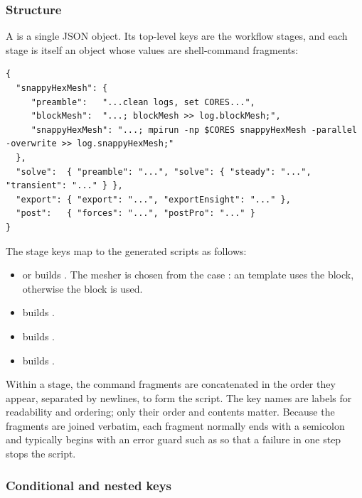 \subsubsection{Structure}

A  is a single JSON object. Its top-level keys are the workflow stages, and each stage is itself an object whose values are shell-command fragments:
\begin{lstlisting}
{
  "snappyHexMesh": {
     "preamble":   "...clean logs, set CORES...",
     "blockMesh":  "...; blockMesh >> log.blockMesh;",
     "snappyHexMesh": "...; mpirun -np $CORES snappyHexMesh -parallel -overwrite >> log.snappyHexMesh;"
  },
  "solve":  { "preamble": "...", "solve": { "steady": "...", "transient": "..." } },
  "export": { "export": "...", "exportEnsight": "..." },
  "post":   { "forces": "...", "postPro": "..." }
}
\end{lstlisting}

The stage keys map to the generated scripts as follows:
\begin{itemize}
    \item {} or  builds . The mesher is chosen from the case : an  template uses the  block, otherwise the  block is used.
    \item {} builds .
    \item {} builds .
    \item {} builds .
\end{itemize}

Within a stage, the command fragments are concatenated in the order they appear, separated by newlines, to form the script. The key names are labels for readability and ordering; only their order and contents matter. Because the fragments are joined verbatim, each fragment normally ends with a semicolon and typically begins with an error guard such as  so that a failure in one step stops the script.

\subsubsection{Conditional and nested keys}

